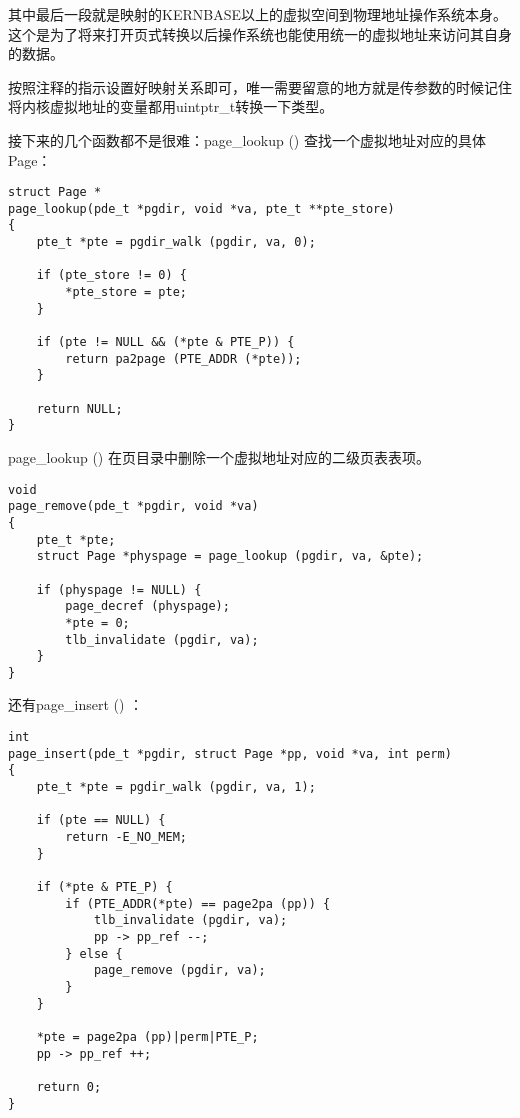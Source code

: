 \documentclass{article}
\newcommand{\funcname}[1]{{\ttfamily \small #1}}
\begin{document}
\begin{CJK*}{UTF8}{gkai}
其中最后一段就是映射的KERNBASE以上的虚拟空间到物理地址操作系统本身。这个是为了将来打开页式转换以后操作系统也能使用统一的虚拟地址来访问其自身的数据。

按照注释的指示设置好映射关系即可，唯一需要留意的地方就是传参数的时候记住将内核虚拟地址的变量都用uintptr\_t转换一下类型。

接下来的几个函数都不是很难：\funcname{page\_lookup ()} 查找一个虚拟地址对应的具体Page：

\begin{lstlisting}[style=ccode, title={\scriptsize \ttfamily \bfseries kern/pmap.c: page\_lookup ()}]
struct Page *
page_lookup(pde_t *pgdir, void *va, pte_t **pte_store)
{
    pte_t *pte = pgdir_walk (pgdir, va, 0);

    if (pte_store != 0) {
        *pte_store = pte;
    }

    if (pte != NULL && (*pte & PTE_P)) {
        return pa2page (PTE_ADDR (*pte));
    }
    
	return NULL;
}
\end{lstlisting}

\funcname{page\_lookup ()} 在页目录中删除一个虚拟地址对应的二级页表表项。

\begin{lstlisting}[style=ccode, title={\scriptsize \ttfamily \bfseries kern/pmap.c: page\_remove ()}]
void
page_remove(pde_t *pgdir, void *va)
{
    pte_t *pte;
    struct Page *physpage = page_lookup (pgdir, va, &pte);

    if (physpage != NULL) {
        page_decref (physpage);
        *pte = 0;
        tlb_invalidate (pgdir, va);
    }
}
\end{lstlisting}

还有\funcname{page\_insert () }：

\begin{lstlisting}[style=ccode, title={\scriptsize \ttfamily \bfseries kern/pmap.c: boot\_alloc ()}]
int
page_insert(pde_t *pgdir, struct Page *pp, void *va, int perm) 
{
    pte_t *pte = pgdir_walk (pgdir, va, 1);

    if (pte == NULL) {
        return -E_NO_MEM;
    }

    if (*pte & PTE_P) {
        if (PTE_ADDR(*pte) == page2pa (pp)) {
            tlb_invalidate (pgdir, va);
            pp -> pp_ref --;
        } else {
            page_remove (pgdir, va);
        }
    }
    
    *pte = page2pa (pp)|perm|PTE_P;
    pp -> pp_ref ++;

    return 0;
}
\end{lstlisting}


\end{CJK*}
\end{document}
